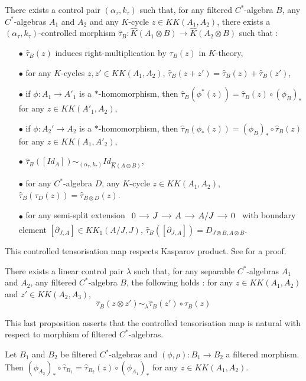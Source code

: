 \begin{thm}
There exists a control pair $(\alpha_\tau,k_\tau)$ such that, for any filtered $C^*$-algebra $B$, any $C^*$-algebras $A_1$ and $A_2$ and any $K$-cycle $z\in KK(A_1,A_2)$, there exists a $(\alpha_\tau,k_\tau)$-controlled morphism $\hat \tau_B : \hat K(A_1\otimes B)\rightarrow \hat K(A_2\otimes B)$
such that :
\begin{itemize}\label{tensorization}
\item[$\bullet$] $\hat \tau_B(z)$ induces right-multiplication by $\tau_B(z)$ in $K$-theory,
\item[$\bullet$] for any $K$-cycles $z,z'\in KK(A_1,A_2)$, $\hat \tau_B(z+z')=\hat\tau_B(z)+\hat\tau_B(z')$,
\item[$\bullet$] if $\phi : A_1\rightarrow A'_1$ is a $*$-homomorphism, then $\hat\tau_B(\phi^*(z)) =  \hat\tau_B(z)\circ (\phi_B)_*$ for any $z\in KK(A'_1,A_2)$,
\item[$\bullet$] if $\phi : A_2'\rightarrow A_2$ is a $*$-homomorphism, then $\hat\tau_B(\phi_*(z)) = (\phi_B)_*\circ \hat\tau_B(z)$ for any $z\in KK(A_1,A'_2)$,
\item[$\bullet$] $\hat \tau_B([Id_A])\sim_{(\alpha_\tau,k_\tau)} Id_{\hat K(A\otimes B)}$,
\item[$\bullet$] for any $C^*$-algebra $D$, any $K$-cycle $z\in KK(A_1,A_2)$, $\hat\tau_B (\tau_D(z))= \hat\tau_{B\otimes D}(z)$.
\item[$\bullet$] for any semi-split extension $\begin{tikzcd}[column sep = small] 0 \arrow{r}& J \arrow{r} & A \arrow{r} & A/J\arrow{r} & 0\end{tikzcd}$ with boundary element $[\partial_{J,A}]\in KK_1(A/J,J)$, $\hat\tau_B([\partial_{J,A}])=D_{J\otimes B,A\otimes B}$.
\end{itemize}
\end{thm}

This controlled tensorisation map respects Kasparov product. See \cite{OY2} for a proof.

\begin{thm}
There exists a linear control pair $\lambda$ such that, for any separable $C^*$-algebras $A_1$ and $A_2$, any filtered $C^*$-algebra $B$, the following holds : for any $z\in KK(A_1,A_2)$ and $z'\in KK(A_2,A_3)$,
\[\hat\tau_B(z\otimes z')\sim_\lambda \hat\tau_B(z')\circ\hat\tau_B(z)\]
\end{thm}

This last proposition asserts that the controlled tensorisation map is natural with respect to morphism of filtered $C^*$-algebras. \cite{OY2}

\begin{prop}
Let $B_1$ and $B_2$ be filtered $C^*$-algebras and $(\phi,\rho) :B_1\rightarrow B_2 $ a filtered morphism. Then $ (\phi_{A_2})_*\circ \hat \tau_{B_1}=\hat \tau_{B_2}(z)\circ(\phi_{A_1})_* $ for any $z\in KK(A_1,A_2)$.
\end{prop}




















 
